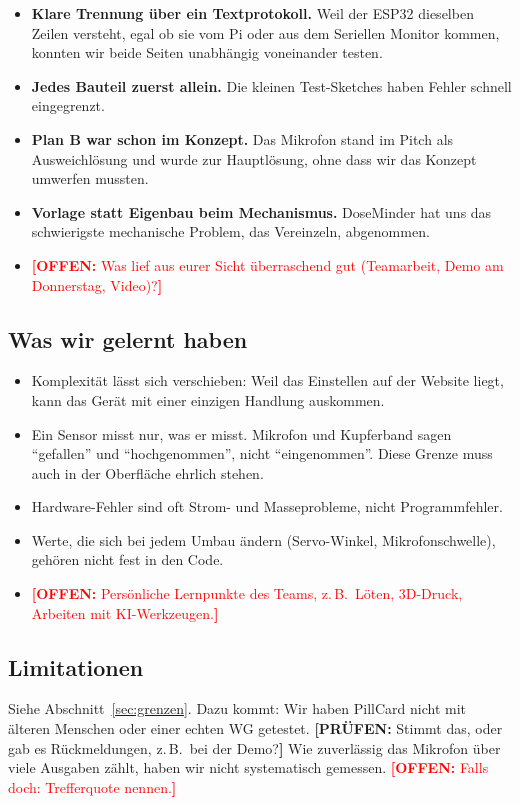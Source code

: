 \documentclass[11pt,a4paper]{article}
\newcommand{\offen}[1]{\textcolor{red}{\textbf{[OFFEN:} #1\textbf{]}}}
\newcommand{\pruefen}[1]{\textcolor{orange!85!black}{\textbf{[PRÜFEN:} #1\textbf{]}}}
\begin{document}
\begin{itemize}
\item \textbf{Klare Trennung über ein Textprotokoll.} Weil der ESP32 dieselben Zeilen versteht, egal ob sie vom
  Pi oder aus dem Seriellen Monitor kommen, konnten wir beide Seiten unabhängig voneinander testen.
\item \textbf{Jedes Bauteil zuerst allein.} Die kleinen Test-Sketches haben Fehler schnell eingegrenzt.
\item \textbf{Plan B war schon im Konzept.} Das Mikrofon stand im Pitch als Ausweichlösung und wurde zur
  Hauptlösung, ohne dass wir das Konzept umwerfen mussten.
\item \textbf{Vorlage statt Eigenbau beim Mechanismus.} DoseMinder hat uns das schwierigste mechanische
  Problem, das Vereinzeln, abgenommen.
\item \offen{Was lief aus eurer Sicht überraschend gut (Teamarbeit, Demo am Donnerstag, Video)?}
\end{itemize}

\subsection{Was wir gelernt haben}

\begin{itemize}
\item Komplexität lässt sich verschieben: Weil das Einstellen auf der Website liegt, kann das Gerät mit einer
  einzigen Handlung auskommen.
\item Ein Sensor misst nur, was er misst. Mikrofon und Kupferband sagen \enquote{gefallen} und
  \enquote{hochgenommen}, nicht \enquote{eingenommen}. Diese Grenze muss auch in der Oberfläche ehrlich
  stehen.
\item Hardware-Fehler sind oft Strom- und Masseprobleme, nicht Programmfehler.
\item Werte, die sich bei jedem Umbau ändern (Servo-Winkel, Mikrofonschwelle), gehören nicht fest in den Code.
\item \offen{Persönliche Lernpunkte des Teams, z.\,B.\ Löten, 3D-Druck, Arbeiten mit KI-Werkzeugen.}
\end{itemize}

\subsection{Limitationen}

Siehe Abschnitt~\ref{sec:grenzen}. Dazu kommt: Wir haben PillCard nicht mit älteren Menschen oder einer echten
WG getestet. \pruefen{Stimmt das, oder gab es Rückmeldungen, z.\,B.\ bei der Demo?} Wie zuverlässig das Mikrofon
über viele Ausgaben zählt, haben wir nicht systematisch gemessen. \offen{Falls doch: Trefferquote nennen.}
\end{document}
